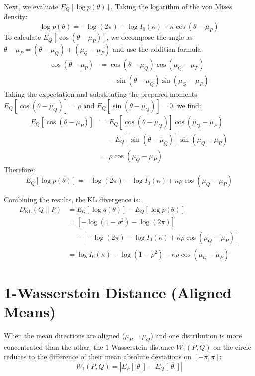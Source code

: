\documentclass[11pt,a4paper]{article}
\begin{document}
Next, we evaluate $E_Q[\log p(\theta)]$. Taking the logarithm of the von Mises density:
\begin{equation}
\log p(\theta) = -\log(2\pi) - \log I_0(\kappa) + \kappa \cos(\theta - \mu_P)
\end{equation}
To calculate $E_Q[\cos(\theta - \mu_P)]$, we decompose the angle as $\theta - \mu_P = (\theta - \mu_Q) + (\mu_Q - \mu_P)$ and use the addition formula:
\begin{align}
\cos(\theta - \mu_P) &= \cos(\theta - \mu_Q) \cos(\mu_Q - \mu_P) \nonumber \\
&\quad - \sin(\theta - \mu_Q) \sin(\mu_Q - \mu_P)
\end{align}
Taking the expectation and substituting the prepared moments $E_Q[\cos(\theta - \mu_Q)] = \rho$ and $E_Q[\sin(\theta - \mu_Q)] = 0$, we find:
\begin{align}
E_Q[\cos(\theta - \mu_P)] &= E_Q[\cos(\theta - \mu_Q)] \cos(\mu_Q - \mu_P) \nonumber \\
&\quad - E_Q[\sin(\theta - \mu_Q)] \sin(\mu_Q - \mu_P) \nonumber \\
&= \rho \cos(\mu_Q - \mu_P)
\end{align}
Therefore:
\begin{equation}
E_Q[\log p(\theta)] = -\log(2\pi) - \log I_0(\kappa) + \kappa \rho \cos(\mu_Q - \mu_P)
\end{equation}

Combining the results, the KL divergence is:
\begin{align}
D_{\text{KL}}(Q \parallel P) &= E_Q[\log q(\theta)] - E_Q[\log p(\theta)] \nonumber \\
&= \left[ -\log(1 - \rho^2) - \log(2\pi) \right] \nonumber \\
&\quad - \left[ -\log(2\pi) - \log I_0(\kappa) + \kappa \rho \cos(\mu_Q - \mu_P) \right] \nonumber \\
&= \log I_0(\kappa) - \log(1 - \rho^2) - \kappa \rho \cos(\mu_Q - \mu_P)
\end{align}

\section{1-Wasserstein Distance (Aligned Means)}
When the mean directions are aligned ($\mu_P = \mu_Q$) and one distribution is more concentrated than the other, the 1-Wasserstein distance $W_1(P, Q)$ on the circle reduces to the difference of their mean absolute deviations on $[-\pi, \pi]$:
\begin{equation}
W_1(P, Q) = | E_P[|\theta|] - E_Q[|\theta|] |
\end{equation}
\end{document}
